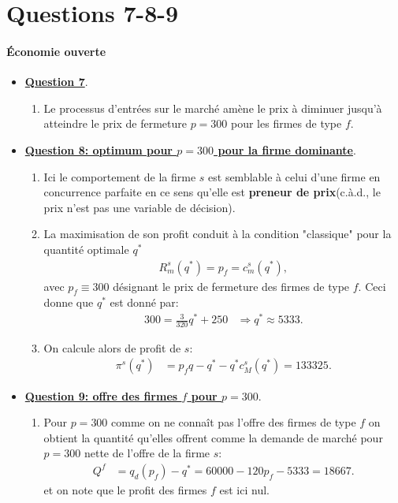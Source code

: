   \section{Questions 7-8-9}
  \frame{\sectionpage}
  \begin{frame}[allowframebreaks]{\insertsection}
     \framesubtitle{Économie ouverte}
  \begin{itemize}
  \item \underline{\textbf{Question 7}}.
  \begin{enumerate}[$\cdot$]
  \item Le processus d'entrées sur le marché amène le prix à diminuer jusqu'à atteindre le prix de fermeture $p=300$ pour les firmes de type $f$.
  \end{enumerate}
  \item  \underline{\textbf{Question 8: optimum pour $p=300$ pour la firme dominante}}.
  \begin{enumerate}[$\cdot$]
  \item Ici le comportement de la firme $s$ est semblable à celui d'une firme en concurrence parfaite en ce sens qu'elle est \textbf{preneur de prix}(c.à.d., le prix n'est pas une variable de décision).
  \item La maximisation de son profit conduit à la condition "classique"  pour la quantité optimale $q^*$
  \begin{align*}
  R_m^s(q^*) = p_f = c_m^s(q^*),
  \end{align*}
  avec $p_f \equiv 300$ désignant le prix de fermeture des firmes de type $f$. Ceci donne que $q^*$ est donné par:
  \begin{align*}
  300= \frac{3}{320}q^* +250 &\Rightarrow  q^* \approx 5333.
  \end{align*}
  \item On calcule alors de profit de $s$:
  \begin{align*}
  \pi^s(q^*) &= p_fq -q^* - q^*c_M^s(q^*) = 133325.
  \end{align*}
  \end{enumerate}
  \item  \underline{\textbf{Question 9: offre des firmes $f$ pour $p=300$}}.
  \begin{enumerate}[$\cdot$]
  \item Pour $p=300$ comme on ne connaît pas l'offre des firmes de type $f$ on obtient la quantité qu'elles offrent comme la demande de marché pour $p=300$ nette de l'offre de la firme $s$:
  \begin{align}
  Q^f &= q_d(p_f) - q^* = 60000 - 120p_f - 5333 = 18667.
  \end{align}
  et on note que le profit des firmes $f$ est ici nul.
  \end{enumerate}
  \end{itemize}
  \end{frame}
  
